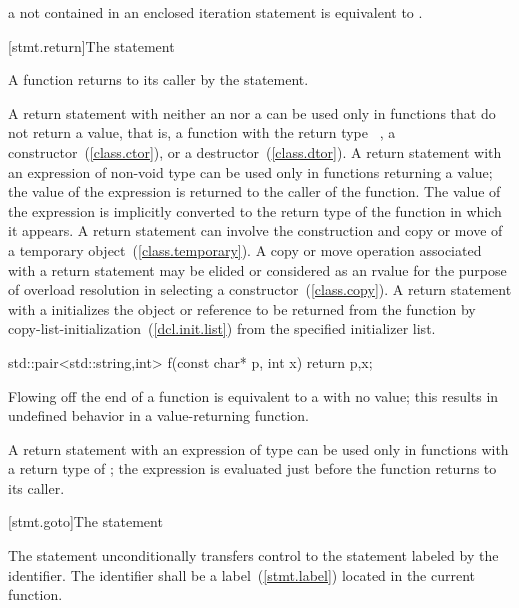 a  not contained in an enclosed iteration statement is
equivalent to  .

[stmt.return]{The  statement}%
%
%

\pnum
A function returns to its caller by the  statement.

\pnum
A return statement
with neither an  nor a 
can be used only in functions
that do not return a value, that is, a function with the return type
\cv\ , a constructor~(\ref{class.ctor}), or a
destructor~(\ref{class.dtor}).
%
%
A return statement with an expression of non-void type can be used only
in functions returning a value; the value of the expression is returned
to the caller of the function.
%
The value of the expression is implicitly converted to the return type of the
function in which it appears. A return statement can involve the
construction and copy or move of a temporary object~(\ref{class.temporary}).
\enternote
A copy or move operation associated with a return statement may be elided or
considered as an rvalue for the purpose of overload resolution in
selecting a constructor~(\ref{class.copy}).
\exitnote A return statement with a  initializes the object or reference to be returned from the function by copy-list-initialization~(\ref{dcl.init.list}) from the specified initializer list. \enterexample

\begin{codeblock}
std::pair<std::string,int> f(const char* p, int x) {
  return {p,x};
}
\end{codeblock}
\exitexample

Flowing off the end of a function is equivalent to a  with
no value; this results in undefined behavior in a value-returning
function.

\pnum
A return statement with an expression of type 
can be used only in functions with a return type of
 ; the expression is evaluated just before the function
returns to its caller.

[stmt.goto]{The  statement}%

\pnum
The  statement unconditionally transfers control to the
statement labeled by the identifier. The identifier shall be a
%
label~(\ref{stmt.label}) located in the current function.

